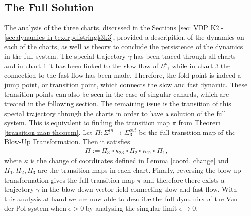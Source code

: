 \subsection{The Full Solution}
The analysis of the three charts, discussed in the Sections \ref{sec: VDP K2}-\ref{sec:dynamics-in-texorpdfstringk3k3}, provided a descripition of the dynamics on each of the charts, as well as theory to conclude the persistence of the dynamics in the full system.
The special trajectory $\gamma$ has been traced through all charts and in chart 1 it has been linked to the slow flow of $S^a$, while in chart 3 the connection to the fast flow has been made. Therefore, the fold point is indeed a jump point, or transition point, which connects the slow and fast dynamic.
These transition points can also be seen in the case of singular canards, which are treated in the following section.
The remaining issue is the transition of this special trajectory through the charts in order to have a solution of the full system. 
This is equivalent to finding the transition map $\pi$ from Theorem \ref{transition map theorem}.
Let $\Pi: \Sigma^{in}_1 \to \Sigma^{out}_3$ be the full transition map of the Blow-Up Transformation. Then it satisfies
\begin{align*}
\Pi := \Pi_3 \circ \kappa_{23} \circ \Pi_2 \circ \kappa_{12} \circ \Pi_1,
\end{align*}
where $\kappa$ is the change of coordinates defined in Lemma \ref{coord. change} and $\Pi_1, \Pi_2, \Pi_3$ are the transition maps in each chart.
Finally, reversing the blow up transformation gives the full transition map $\pi$ and therefore there exists a trajectory $\gamma$ in the blow down vector field connecting slow and fast flow.
With this analysis at hand we are now able to describe the full dynamics of the Van der Pol system when $\epsilon>0$ by analysing the singular limit $\epsilon \to 0$. 

